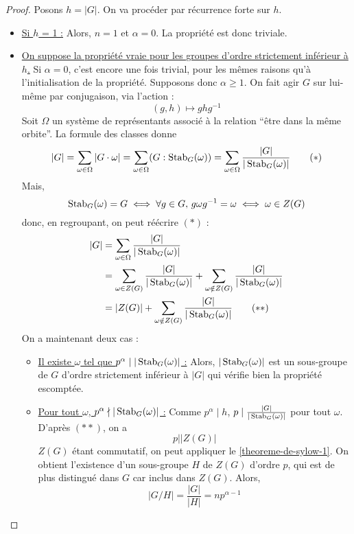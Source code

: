   \begin{proof}
    Posons $h = \vert G \vert$. On va procéder par récurrence forte sur $h$.
    \begin{itemize}
      \item \underline{Si $h$ = 1 :} Alors, $n = 1$ et $\alpha = 0$. La propriété est donc triviale.
      \item \underline{On suppose la propriété vraie pour les groupes d'ordre strictement inférieur à $h$.} Si $\alpha = 0$, c'est encore une fois trivial, pour les mêmes raisons qu'à l'initialisation de la propriété. Supposons donc $\alpha \geq 1$. On fait agir $G$ sur lui-même par conjugaison, via l'action :
      \[ (g,h) \mapsto ghg^{-1} \]
      Soit $\Omega$ un système de représentants associé à la relation ``être dans la même orbite''. La formule des classes donne
      \[ |G| = \sum_{\omega \in \Omega} |G \cdot \omega| = \sum_{\omega \in \Omega} (G : \operatorname{Stab}_G(\omega)) = \sum_{\omega \in \Omega} \frac{|G|}{|\operatorname{Stab}_G(\omega)|} \tag{$*$} \]
      Mais,
      \[ \operatorname{Stab}_G(\omega) = G \iff \forall g \in G, \, g \omega g^{-1} = \omega \iff \omega \in Z(G) \]
      donc, en regroupant, on peut réécrire $(*)$ :
      \begin{align*}
        |G| &= \sum_{\omega \in \Omega} \frac{|G|}{|\operatorname{Stab}_G(\omega)|} \\
        & = \sum_{\omega \in Z(G)} \frac{|G|}{|\operatorname{Stab}_G(\omega)|} + \sum_{\omega \notin Z(G)} \frac{|G|}{|\operatorname{Stab}_G(\omega)|} \\
        &= \vert Z(G) \vert + \sum_{\omega \notin Z(G)} \frac{|G|}{|\operatorname{Stab}_G(\omega)|} \tag{$**$}
      \end{align*}
      On a maintenant deux cas :
      \begin{itemize}
        \item \underline{Il existe $\omega$ tel que $p^\alpha \mid |\operatorname{Stab}_G(\omega)|$ :} Alors, $|\operatorname{Stab}_G(\omega)|$ est un sous-groupe de $G$ d'ordre strictement inférieur à $\vert G \vert$ qui vérifie bien la propriété escomptée.
        \item \underline{Pour tout $\omega$, $p^\alpha \nmid |\operatorname{Stab}_G(\omega)|$ :} Comme $p^\alpha \mid h$, $p \mid \frac{|G|}{|\operatorname{Stab}_G(\omega)|}$ pour tout $\omega$. D'après $(**)$, on a
        \[ p \mid \vert Z(G) \vert \]
        $Z(G)$ étant commutatif, on peut appliquer le \cref{theoreme-de-sylow-1}. On obtient l'existence d'un sous-groupe $H$ de $Z(G)$ d'ordre $p$, qui est de plus distingué dans $G$ car inclus dans $Z(G)$. Alors,
        \[ \vert G/H \vert = \frac{\vert G \vert}{\vert H \vert} = np^{\alpha - 1} \]

\end{itemize}
\end{itemize}
\end{proof}
